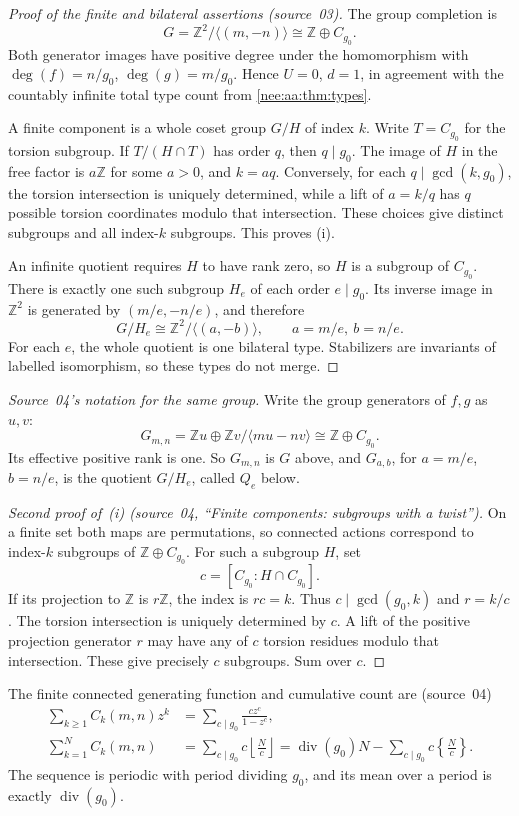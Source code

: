 \documentclass[11pt,letterpaper]{article}
\numberwithin{equation}{section}
\theoremstyle{plain}
\theoremstyle{definition}
\theoremstyle{remark}
\newcommand{\ZZ}{\mathbb Z}
\begin{document}
\begin{proof}[Proof of the finite and bilateral assertions (source~03)]
The group completion is
\[
G=\ZZ^2/\langle(m,-n)\rangle\cong\ZZ\oplus C_{g_0}.
\]
Both generator images have positive degree under the homomorphism with
$\deg(f)=n/g_0$, $\deg(g)=m/g_0$. Hence $U=0$, $d=1$, in agreement with the
countably infinite total type count from \cref{nee:aa:thm:types}.

A finite component is a whole coset group $G/H$ of index $k$. Write
$T=C_{g_0}$ for the torsion subgroup. If $T/(H\cap T)$ has order $q$, then
$q\mid g_0$. The image of $H$ in the free factor is $a\ZZ$ for some $a>0$,
and $k=aq$. Conversely, for each $q\mid\gcd(k,g_0)$, the torsion intersection
is uniquely determined, while a lift of $a=k/q$ has $q$ possible torsion
coordinates modulo that intersection. These choices give distinct subgroups
and all index-$k$ subgroups. This proves (i).

An infinite quotient requires $H$ to have rank zero, so $H$ is a subgroup
of $C_{g_0}$. There is exactly one such subgroup $H_e$ of each order
$e\mid g_0$. Its inverse image in $\ZZ^2$ is generated by
$(m/e,-n/e)$, and therefore
\[
G/H_e\cong\ZZ^2/\langle(a,-b)\rangle,
\qquad a=m/e,\ b=n/e.
\]
For each $e$, the whole quotient is one bilateral type. Stabilizers are
invariants of labelled isomorphism, so these types do not merge.
\end{proof}

\emph{Source~04's notation for the same group.} Write the group generators of $f,g$ as $u,v$:
\[
G_{m,n}=\ZZ u\oplus\ZZ v\big/\langle mu-nv\rangle
       \cong\ZZ\oplus C_{g_0}.
\]
Its effective positive rank is one. So $G_{m,n}$ is $G$ above, and $G_{a,b}$, for $a=m/e$, $b=n/e$, is the quotient $G/H_e$, called $Q_e$ below.

\begin{proof}[Second proof of~(i) (source~04, ``Finite components: subgroups with a twist'')]
On a finite set both maps are permutations, so connected actions
correspond to index-$k$ subgroups of $\ZZ\oplus C_{g_0}$.
For such a subgroup $H$, set
\[
c=[C_{g_0}:H\cap C_{g_0}].
\]
If its projection to $\ZZ$ is $r\ZZ$, the index is
$rc=k$. Thus $c\mid\gcd(g_0,k)$ and $r=k/c$.
The torsion intersection is uniquely determined by $c$.
A lift of the positive projection generator $r$ may have
any of $c$ torsion residues modulo that intersection.
These give precisely $c$ subgroups. Sum over $c$.
\end{proof}

The finite connected generating function and cumulative count are (source~04)
\begin{align}
\sum_{k\geq1}C_k(m,n)z^k
 &=\sum_{c\mid g_0}\frac{c z^c}{1-z^c},\label{nee:ci:eq:finitegf}\\
\sum_{k=1}^N C_k(m,n)
 &=\sum_{c\mid g_0}c\left\lfloor\frac Nc\right\rfloor
  =\operatorname{div}(g_0)N-\sum_{c\mid g_0}c\left\{\frac Nc\right\}.
\label{nee:ci:eq:finitecumulative}
\end{align}
The sequence is periodic with period dividing $g_0$,
and its mean over a period is exactly $\operatorname{div}(g_0)$.
\end{document}
